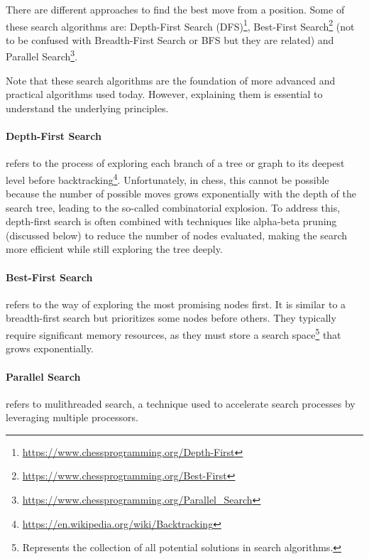 There are different approaches to find the best move from a position. Some of these search algorithms are: Depth-First Search (DFS)\footnote{\url{https://www.chessprogramming.org/Depth-First}}, Best-First Search\footnote{\url{https://www.chessprogramming.org/Best-First}} (not to be confused with Breadth-First Search or BFS but they are related) and Parallel Search\footnote{\url{https://www.chessprogramming.org/Parallel_Search}}.

\vspace{1em}

\noindent Note that these search algorithms are the foundation of more advanced and practical algorithms used today. However, explaining them is essential to understand the underlying principles.

\paragraph{Depth-First Search} refers to the process of exploring each branch of a tree or graph to its deepest level before backtracking\footnote{\url{https://en.wikipedia.org/wiki/Backtracking}}. Unfortunately, in chess, this cannot be possible because the number of possible moves grows exponentially with the depth of the search tree, leading to the so-called combinatorial explosion. To address this, depth-first search is often combined with techniques like alpha-beta pruning (discussed below) to reduce the number of nodes evaluated, making the search more efficient while still exploring the tree deeply.

\paragraph{Best-First Search} refers to the way of exploring the most promising nodes first. It is similar to a breadth-first search but prioritizes some nodes before others. They typically require significant memory resources, as they must store a search space\footnote{Represents the collection of all potential solutions in search algorithms.} that grows exponentially.

\paragraph{Parallel Search} refers to mulithreaded search, a technique used to accelerate search processes by leveraging multiple processors.

\vspace{1em}


